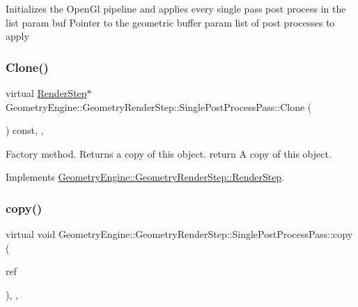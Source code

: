 Initializes the Open\+Gl pipeline and applies every single pass post process in the list param buf Pointer to the geometric buffer param list of post processes to apply \mbox{\label{class_geometry_engine_1_1_geometry_render_step_1_1_single_post_process_pass_adbbe0bb9d41386ced4080877f030407a}} 
\subsubsection{\texorpdfstring{Clone()}{Clone()}}
{\footnotesize\ttfamily virtual \mbox{\hyperlink{class_geometry_engine_1_1_geometry_render_step_1_1_render_step}{Render\+Step}}$\ast$ Geometry\+Engine\+::\+Geometry\+Render\+Step\+::\+Single\+Post\+Process\+Pass\+::\+Clone (\begin{DoxyParamCaption}{ }\end{DoxyParamCaption}) const\hspace{0.3cm}{\ttfamily [inline]}, {\ttfamily [override]}, {\ttfamily [virtual]}}

Factory method. Returns a copy of this object. return A copy of this object. 

Implements \mbox{\hyperlink{class_geometry_engine_1_1_geometry_render_step_1_1_render_step_afe33ea9d82c5be11f55af7d39691d44b}{Geometry\+Engine\+::\+Geometry\+Render\+Step\+::\+Render\+Step}}.

\mbox{\label{class_geometry_engine_1_1_geometry_render_step_1_1_single_post_process_pass_a9b73ca0ef1ca7af5e8187ab24078b0cd}} 
\subsubsection{\texorpdfstring{copy()}{copy()}}
{\footnotesize\ttfamily virtual void Geometry\+Engine\+::\+Geometry\+Render\+Step\+::\+Single\+Post\+Process\+Pass\+::copy (\begin{DoxyParamCaption}\item[{const \mbox{\hyperlink{class_geometry_engine_1_1_geometry_render_step_1_1_single_post_process_pass}{Single\+Post\+Process\+Pass}} \&}]{ref }\end{DoxyParamCaption})\hspace{0.3cm}{\ttfamily [inline]}, {\ttfamily [protected]}, {\ttfamily [virtual]}}


